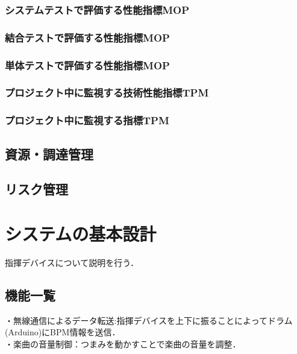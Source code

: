 \documentclass[lualatex,book,paper=a4paper,jafontsize=11.5pt,jafontscale=1.05]{jlreq}
\begin{document}
\subsection{システムテストで評価する性能指標MOP}

\subsection{結合テストで評価する性能指標MOP}

\subsection{単体テストで評価する性能指標MOP}

\subsection{プロジェクト中に監視する技術性能指標TPM}

\subsection{プロジェクト中に監視する指標TPM}


\section{資源・調達管理}


\section{リスク管理}


\chapter{システムの基本設計}

指揮デバイスについて説明を行う．


\section{機能一覧}
・無線通信によるデータ転送:指揮デバイスを上下に振ることによってドラム(Arduino)にBPM情報を送信．\\
・楽曲の音量制御：つまみを動かすことで楽曲の音量を調整．
\end{document}
